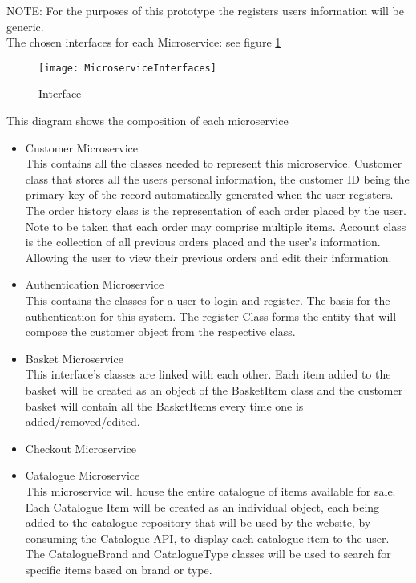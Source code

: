 NOTE: For the purposes of this prototype the registers users information will be generic.
\pagebreak
\\The chosen interfaces for each Microservice: see figure \ref{fig:MSAInterfaces}\\
\begin{figure}[h]
	\caption{Interface}
	\label{fig:MSAInterfaces}
	\texttt{[image: MicroserviceInterfaces]}
\end{figure}
This diagram shows the composition of each microservice
\begin{itemize}
	\item Customer Microservice\\
	This contains all the classes needed to represent this microservice. Customer class that stores all the users personal information, the customer ID being the primary key of the record automatically generated when the user registers. The order history class is the representation of each order placed by the user. Note to be taken that each order may comprise multiple items.   Account class is the collection of all previous orders placed and the user's information. Allowing the user to view their previous orders and edit their information.
	\item Authentication Microservice\\
	This contains the classes for a user to login and register. The basis for the authentication for this system. The register Class forms the entity that will compose the customer object from the respective class.
	\item Basket Microservice\\
	This interface's classes are linked with each other. Each item added to the basket will be created as an object of the BasketItem class and the customer basket will contain all the BasketItems every time one is added/removed/edited.
	\item Checkout Microservice\\
	\item Catalogue Microservice\\
	This microservice will house the entire catalogue of items available for sale. Each Catalogue Item will be created as an individual object, each being added to the catalogue repository that will be used by the website, by consuming the Catalogue API, to display each catalogue item to the user. The CatalogueBrand and CatalogueType classes will be used to search for specific items based on brand or type.
\end{itemize}
